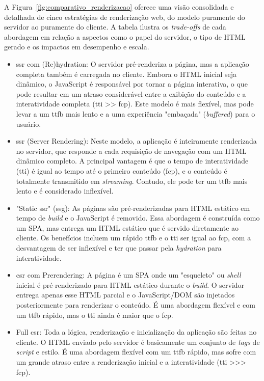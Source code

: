 A Figura~\ref{fig:comparativo_renderizacao} oferece uma visão consolidada e detalhada de cinco estratégias de renderização web, do modelo puramente do servidor ao puramente do cliente. A tabela ilustra os \textit{trade-offs} de cada abordagem em relação a aspectos como o papel do servidor, o tipo de HTML gerado e os impactos em desempenho e escala.

\begin{itemize}
    \item \acrshort{ssr} com (Re)hydration: O servidor pré-renderiza a página, mas a aplicação completa também é carregada no cliente. Embora o HTML inicial seja dinâmico, o JavaScript é responsável por tornar a página interativa, o que pode resultar em um atraso considerável entre a exibição do conteúdo e a interatividade completa (\acrshort{tti} >> \acrshort{fcp}). Este modelo é mais flexível, mas pode levar a um \acrshort{ttfb} mais lento e a uma experiência "embaçada" (\textit{buffered}) para o usuário.

    \item \acrshort{ssr} (Server Rendering): Neste modelo, a aplicação é inteiramente renderizada no servidor, que responde a cada requisição de navegação com um HTML dinâmico completo. A principal vantagem é que o tempo de interatividade (\acrshort{tti}) é igual ao tempo até o primeiro conteúdo (\acrshort{fcp}), e o conteúdo é totalmente transmitido em \textit{streaming}. Contudo, ele pode ter um \acrshort{ttfb} mais lento e é considerado inflexível.

    \item "Static \acrshort{ssr}" (\acrshort{ssg}): As páginas são pré-renderizadas para HTML estático em tempo de \textit{build} e o JavaScript é removido. Essa abordagem é construída como um SPA, mas entrega um HTML estático que é servido diretamente ao cliente. Os benefícios incluem um rápido \acrshort{ttfb} e o \acrshort{tti} ser igual ao \acrshort{fcp}, com a desvantagem de ser inflexível e ter que passar pela \textit{hydration} para interatividade.

    \item \acrshort{csr} com Prerendering: A página é um SPA onde um "esqueleto" ou \textit{shell} inicial é pré-renderizado para HTML estático durante o \textit{build}. O servidor entrega apenas esse HTML parcial e o JavaScript/DOM são injetados posteriormente para renderizar o conteúdo. É uma abordagem flexível e com um \acrshort{ttfb} rápido, mas o \acrshort{tti} ainda é maior que o \acrshort{fcp}.

    \item Full \acrshort{csr}: Toda a lógica, renderização e inicialização da aplicação são feitas no cliente. O HTML enviado pelo servidor é basicamente um conjunto de \textit{tags} de \textit{script} e estilo. É uma abordagem flexível com um \acrshort{ttfb} rápido, mas sofre com um grande atraso entre a renderização inicial e a interatividade (\acrshort{tti} >>> \acrshort{fcp}).
\end{itemize}

